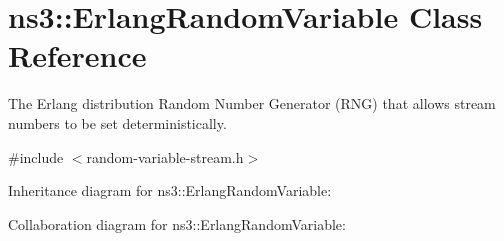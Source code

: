 \hypertarget{classns3_1_1ErlangRandomVariable}{}\section{ns3\+:\+:Erlang\+Random\+Variable Class Reference}
\label{classns3_1_1ErlangRandomVariable}


The Erlang distribution Random Number Generator (R\+NG) that allows stream numbers to be set deterministically.  




{\ttfamily \#include $<$random-\/variable-\/stream.\+h$>$}



Inheritance diagram for ns3\+:\+:Erlang\+Random\+Variable\+:


Collaboration diagram for ns3\+:\+:Erlang\+Random\+Variable\+:
